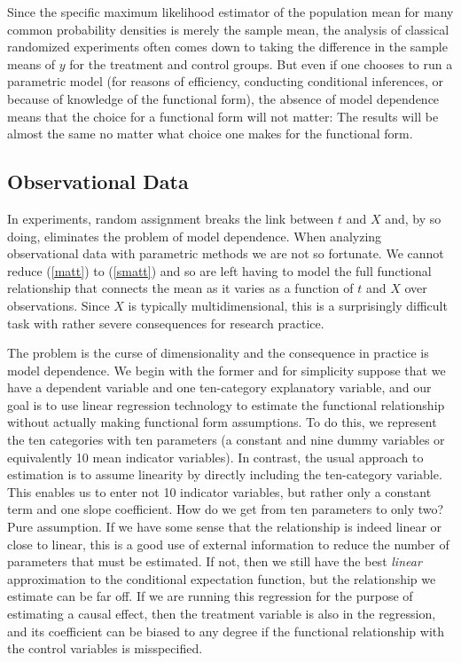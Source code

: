 \documentclass[11pt,titlepage]{article}
\begin{document}
Since the specific maximum likelihood estimator of the population mean
for many common probability densities is merely the sample mean, the
analysis of classical randomized experiments often comes down to
taking the difference in the sample means of $y$ for the treatment and
control groups.  But even if one chooses to run a parametric model
(for reasons of efficiency, conducting conditional inferences, or
because of knowledge of the functional form), the absence of model
dependence means that the choice for a functional form will not
matter: The results will be almost the same no matter what choice one
makes for the functional form.

\subsection{Observational Data} \label{s:paraobs}

In experiments, random assignment breaks the link between $t$ and $X$
and, by so doing, eliminates the problem of model dependence.  When
analyzing observational data with parametric methods we are not so
fortunate.  We cannot reduce (\ref{matt}) to (\ref{smatt}) and so are
left having to model the full functional relationship that connects
the mean as it varies as a function of $t$ and $X$ over observations.
Since $X$ is typically multidimensional, this is a surprisingly
difficult task with rather severe consequences for research practice.

The problem is the curse of dimensionality and the consequence in
practice is model dependence.  We begin with the former and for
simplicity suppose that we have a dependent variable and one
ten-category explanatory variable, and our goal is to use linear
regression technology to estimate the functional relationship without
actually making functional form assumptions.  To do this, we represent
the ten categories with ten parameters (a constant and nine dummy
variables or equivalently 10 mean indicator variables).  In contrast,
the usual approach to estimation is to assume linearity by directly
including the ten-category variable.  This enables us to enter not 10
indicator variables, but rather only a constant term and one slope
coefficient.  How do we get from ten parameters to only two?  Pure
assumption.  If we have some sense that the relationship is indeed
linear or close to linear, this is a good use of external information
to reduce the number of parameters that must be estimated.  If not,
then we still have the best {\it linear} approximation to the
conditional expectation function, but the relationship we estimate can
be far off.  If we are running this regression for the purpose of
estimating a causal effect, then the treatment variable is also in the
regression, and its coefficient can be biased to any degree if the
functional relationship with the control variables is misspecified.
\end{document}
